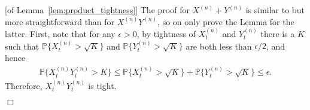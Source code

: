 \documentclass[12pt]{article}
\newenvironment {proof}{{\noindent\bf Proof }}{\hfill $\Box$ \medskip}
\newcommand{\IP}{\mathbb P}
\numberwithin{equation}{section}
\begin{document}
\begin{proof}[of Lemma~\ref{lem:product_tightness}]
    The proof for $X^{(n)} + Y^{(n)}$ is similar to but more straightforward than
    for $X^{(n)} Y^{(n)}$, so on only prove the Lemma for the latter.
    First, note that for any $\epsilon > 0$, by tightness of $X^{(n)}_t$ and $Y^{(n)}_t$
    there is a $K$ such that
    $\IP\{ X^{(n)}_t > \sqrt{K} \}$ and $\IP\{ Y^{(n)}_t > \sqrt{K} \}$
    are both less than $\epsilon/2$,
    and hence
    \begin{align*}
        \IP\{
            X^{(n)}_t Y^{(n)}_t > K
        \}
        \le
        \IP\{
            X^{(n)}_t > \sqrt{K}
        \}
        +
        \IP\{
            Y^{(n)}_t > \sqrt{K}
        \} 
        \le \epsilon.
    \end{align*}
    Therefore, $X^{(n)}_t Y^{(n)}_t$ is tight.


\end{proof}
\end{document}

